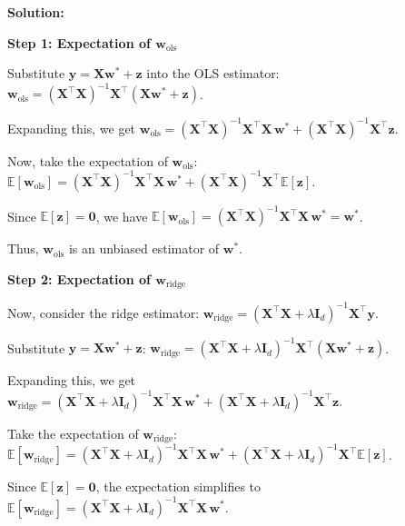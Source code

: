 \documentclass{article}
\newenvironment{solution}{\color{blue} \smallskip \textbf{Solution:}}{}
\begin{document}
\begin{enumerate}[(a)]
    \begin{solution}

\textbf{Step 1: Expectation of \(\mathbf{w}_{\text{ols}}\)}

Substitute \(\mathbf{y} = \mathbf{X} \mathbf{w}^* + \mathbf{z}\) into the OLS estimator: 
\(\mathbf{w}_{\text{ols}} = (\mathbf{X}^\top \mathbf{X})^{-1} \mathbf{X}^\top (\mathbf{X} \mathbf{w}^* + \mathbf{z})\).

Expanding this, we get \(\mathbf{w}_{\text{ols}} = (\mathbf{X}^\top \mathbf{X})^{-1} \mathbf{X}^\top \mathbf{X} \, \mathbf{w}^* + (\mathbf{X}^\top \mathbf{X})^{-1} \mathbf{X}^\top \mathbf{z}\).

Now, take the expectation of \(\mathbf{w}_{\text{ols}}\): 
\(\mathbb{E}[\mathbf{w}_{\text{ols}}] = (\mathbf{X}^\top \mathbf{X})^{-1} \mathbf{X}^\top \mathbf{X} \, \mathbf{w}^* + (\mathbf{X}^\top \mathbf{X})^{-1} \mathbf{X}^\top \mathbb{E}[\mathbf{z}]\).

Since \(\mathbb{E}[\mathbf{z}] = \mathbf{0}\), we have \(\mathbb{E}[\mathbf{w}_{\text{ols}}] = (\mathbf{X}^\top \mathbf{X})^{-1} \mathbf{X}^\top \mathbf{X} \, \mathbf{w}^* = \mathbf{w}^*\).

Thus, \(\mathbf{w}_{\text{ols}}\) is an unbiased estimator of \(\mathbf{w}^*\).


\textbf{Step 2: Expectation of \(\mathbf{w}_{\text{ridge}}\)}

Now, consider the ridge estimator: 
\(\mathbf{w}_{\text{ridge}} = (\mathbf{X}^\top \mathbf{X} + \lambda \mathbf{I}_d)^{-1} \mathbf{X}^\top \mathbf{y}\).

Substitute \(\mathbf{y} = \mathbf{X} \mathbf{w}^* + \mathbf{z}\): 
\(\mathbf{w}_{\text{ridge}} = (\mathbf{X}^\top \mathbf{X} + \lambda \mathbf{I}_d)^{-1} \mathbf{X}^\top (\mathbf{X} \mathbf{w}^* + \mathbf{z})\).

Expanding this, we get \(\mathbf{w}_{\text{ridge}} = (\mathbf{X}^\top \mathbf{X} + \lambda \mathbf{I}_d)^{-1} \mathbf{X}^\top \mathbf{X} \, \mathbf{w}^* + (\mathbf{X}^\top \mathbf{X} + \lambda \mathbf{I}_d)^{-1} \mathbf{X}^\top \mathbf{z}\).

Take the expectation of \(\mathbf{w}_{\text{ridge}}\): 
\(\mathbb{E}[\mathbf{w}_{\text{ridge}}] = (\mathbf{X}^\top \mathbf{X} + \lambda \mathbf{I}_d)^{-1} \mathbf{X}^\top \mathbf{X} \, \mathbf{w}^* + (\mathbf{X}^\top \mathbf{X} + \lambda \mathbf{I}_d)^{-1} \mathbf{X}^\top \mathbb{E}[\mathbf{z}]\).

Since \(\mathbb{E}[\mathbf{z}] = \mathbf{0}\), the expectation simplifies to \(\mathbb{E}[\mathbf{w}_{\text{ridge}}] = (\mathbf{X}^\top \mathbf{X} + \lambda \mathbf{I}_d)^{-1} \mathbf{X}^\top \mathbf{X} \, \mathbf{w}^*\).


\end{solution}
\end{enumerate}
\end{document}
